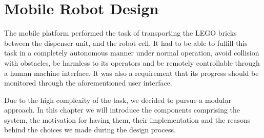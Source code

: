 \chapter{Mobile Robot Design}\label{chap:mobile_robot_chapter}

The mobile platform performed the task of transporting the LEGO bricks between the dispenser unit, and the robot cell. It had to be able to fulfill this task in a completely autonomous manner under normal operation, avoid collision with obstacles, be harmless to its operators and be remotely controllable through a human machine interface. It was also a requirement that its progress should be monitored through the aforementioned user interface. 

Due to the high complexity of the task, we decided to pursue a modular approach. In this chapter we will introduce the components comprising the system, the motivation for having them, their implementation and the reasons behind the choices we made during the design process.












